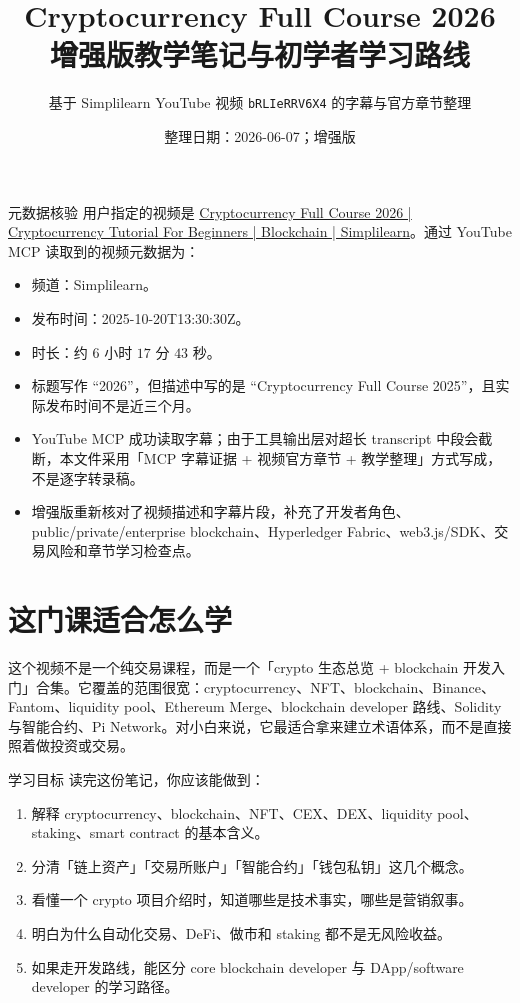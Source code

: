 \documentclass[UTF8,11pt]{ctexart}
\title{\sffamily\bfseries Cryptocurrency Full Course 2026\\增强版教学笔记与初学者学习路线}
\author{基于 Simplilearn YouTube 视频 \texttt{bRLIeRRV6X4} 的字幕与官方章节整理}
\date{整理日期：2026-06-07；增强版}
\begin{document}
\maketitle

\begin{warnbox}{元数据核验}
用户指定的视频是 \href{https://www.youtube.com/watch?v=bRLIeRRV6X4}{Cryptocurrency Full Course 2026 | Cryptocurrency Tutorial For Beginners | Blockchain | Simplilearn}。通过 YouTube MCP 读取到的视频元数据为：
\begin{itemize}
  \item 频道：Simplilearn。
  \item 发布时间：2025-10-20T13:30:30Z。
  \item 时长：约 \(6\) 小时 \(17\) 分 \(43\) 秒。
  \item 标题写作 ``2026''，但描述中写的是 ``Cryptocurrency Full Course 2025''，且实际发布时间不是近三个月。
  \item YouTube MCP 成功读取字幕；由于工具输出层对超长 transcript 中段会截断，本文件采用「MCP 字幕证据 + 视频官方章节 + 教学整理」方式写成，不是逐字转录稿。
  \item 增强版重新核对了视频描述和字幕片段，补充了开发者角色、public/private/enterprise blockchain、Hyperledger Fabric、web3.js/SDK、交易风险和章节学习检查点。
\end{itemize}
\end{warnbox}

\tableofcontents
\newpage

\section{这门课适合怎么学}

这个视频不是一个纯交易课程，而是一个「crypto 生态总览 + blockchain 开发入门」合集。它覆盖的范围很宽：cryptocurrency、NFT、blockchain、Binance、Fantom、liquidity pool、Ethereum Merge、blockchain developer 路线、Solidity 与智能合约、Pi Network。对小白来说，它最适合拿来建立术语体系，而不是直接照着做投资或交易。

\begin{keybox}{学习目标}
读完这份笔记，你应该能做到：
\begin{enumerate}
  \item 解释 cryptocurrency、blockchain、NFT、CEX、DEX、liquidity pool、staking、smart contract 的基本含义。
  \item 分清「链上资产」「交易所账户」「智能合约」「钱包私钥」这几个概念。
  \item 看懂一个 crypto 项目介绍时，知道哪些是技术事实，哪些是营销叙事。
  \item 明白为什么自动化交易、DeFi、做市和 staking 都不是无风险收益。
  \item 如果走开发路线，能区分 core blockchain developer 与 DApp/software developer 的学习路径。
\end{enumerate}
\end{keybox}
\end{document}
